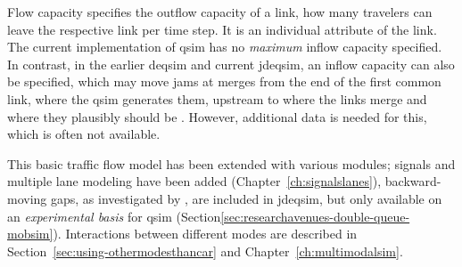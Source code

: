 Flow capacity specifies the outflow capacity of a link, \ie how many travelers can leave the respective link per time step. 
It is an individual attribute of the link.  
The current implementation of \gls{qsim} has no \emph{maximum} inflow capacity specified.
In contrast, in the earlier \gls{deqsim} and current \gls{jdeqsim}, an 
inflow capacity can also be specified, which may move jams at merges from the end of the first common link, where the \gls{qsim} generates them, upstream to where the links merge and where they plausibly should be \citep[][p.~99]{Charypar_PhDThesis_2008}. 
However, additional data is needed for this, which is often not available.

This basic traffic flow model has been extended with various modules; signals and multiple lane modeling have been added (Chapter~\ref{ch:signalslanes}), 
backward-moving gaps, as investigated by \citet[][]{Charypar_PhDThesis_2008}, are included in \gls{jdeqsim}, but only available on an \emph{experimental basis} for \gls{qsim} (Section\ref{sec:researchavenues-double-queue-mobsim}). 
Interactions between different modes are described in Section~\ref{sec:using-othermodesthancar} and Chapter~\ref{ch:multimodalsim}. 

